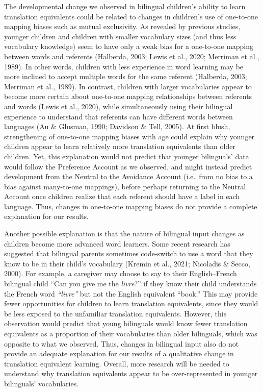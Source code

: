\documentclass[
  english,
  ,man,floatsintext]{apa6}
\begin{document}
The developmental change we observed in bilingual children's ability to learn translation equivalents could be related to changes in children's use of one-to-one mapping biases such as mutual exclusivity. As revealed by previous studies, younger children and children with smaller vocabulary sizes (and thus less vocabulary knowledge) seem to have only a weak bias for a one-to-one mapping between words and referents (Halberda, 2003; Lewis et al., 2020; Merriman et al., 1989). In other words, children with less experience in word learning may be more inclined to accept multiple words for the same referent (Halberda, 2003; Merriman et al., 1989). In contrast, children with larger vocabularies appear to become more certain about one-to-one mapping relationships between referents and words (Lewis et al., 2020), while simultaneously using their bilingual experience to understand that referents can have different words between languages (Au \& Glusman, 1990; Davidson \& Tell, 2005). At first blush, strengthening of one-to-one mapping biases with age could explain why younger children appear to learn relatively more translation equivalents than older children. Yet, this explanation would not predict that younger bilinguals' data would follow the Preference Account as we observed, and might instead predict development from the Neutral to the Avoidance Account (i.e.~from no bias to a bias against many-to-one mappings), before perhaps returning to the Neutral Account once children realize that each referent should have a label in each language. Thus, changes in one-to-one mapping biases do not provide a complete explanation for our results.

Another possible explanation is that the nature of bilingual input changes as children become more advanced word learners. Some recent research has suggested that bilingual parents sometimes code-switch to use a word that they know to be in their child's vocabulary (Kremin et al., 2021; Nicoladis \& Secco, 2000). For example, a caregiver may choose to say to their English--French bilingual child ``Can you give me the \emph{livre}?'' if they know their child understands the French word \emph{``livre''} but not the English equivalent ``book.'' This may provide fewer opportunities for children to learn translation equivalents, since they would be less exposed to the unfamiliar translation equivalents. However, this observation would predict that young bilinguals would know fewer translation equivalents as a proportion of their vocabularies than older bilinguals, which was opposite to what we observed. Thus, changes in bilingual input also do not provide an adequate explanation for our results of a qualitative change in translation equivalent learning. Overall, more research will be needed to understand why translation equivalents appear to be over-represented in younger bilinguals' vocabularies.
\end{document}
